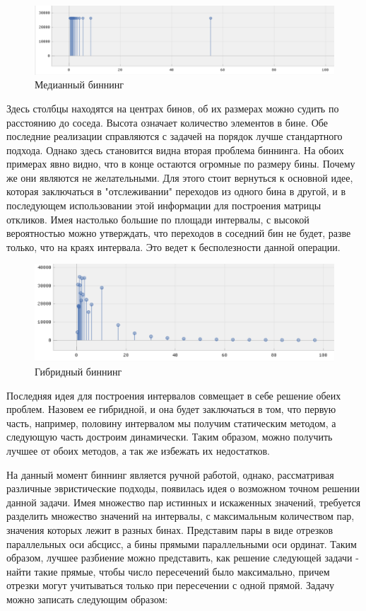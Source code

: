 \documentclass[a4paper,12pt]{diplom}
\begin{document}
 \begin{figure}[h!]
   \centering
   \includegraphics[width=\linewidth]{images/rig_median_binning.png}
   \caption{Медианный биннинг}
 \end{figure}
 

Здесь столбцы находятся на центрах бинов, об их размерах можно судить по расстоянию до соседа. Высота означает количество элементов в бине. 
Обе последние реализации справляются с задачей на порядок лучше стандартного подхода. Однако здесь становится видна вторая проблема биннинга.
На обоих примерах явно видно, что в конце остаются огромные по размеру бины. Почему же они являются не желательными. Для этого стоит вернуться к основной 
идее, которая заключаться в "отслеживании" переходов из одного бина в другой, и в последующем использовании этой информации для построения матрицы 
откликов. Имея настолько большие по площади интервалы, с высокой вероятностью можно утверждать, что переходов в соседний бин не будет, разве только,
что на краях интервала. Это ведет к бесполезности данной операции.

\begin{figure}[h!]
   \centering
   \includegraphics[width=\linewidth]{images/hybrid_binningpng.png}
   \caption{Гибридный биннинг}
   \label{photo:hybrid_binning}
\end{figure}

Последняя идея для построения интервалов совмещает в себе решение обеих проблем. Назовем ее гибридной, и она будет заключаться в том, что 
первую часть, например, половину интервалом мы получим статическим методом, а следующую часть достроим динамически. Таким образом, можно получить 
лучшее от обоих методов, а так же избежать их недостатков.

На данный момент биннинг является ручной работой, однако, рассматривая различные эвристические подходы, появилась идея о возможном точном решении 
данной задачи. Имея множество пар истинных и искаженных значений, требуется разделить множество значений на интервалы, с максимальным количеством 
пар, значения которых лежит в разных бинах. Представим пары в виде отрезков параллельных оси абсцисс, а бины прямыми параллельными оси ординат. 
Таким образом, лучшее разбиение можно представить, как решение следующей задачи - найти такие прямые, чтобы число пересечений было максимально, 
причем отрезки могут учитываться только при пересечении с одной прямой. Задачу можно записать следующим образом:
\end{document}
